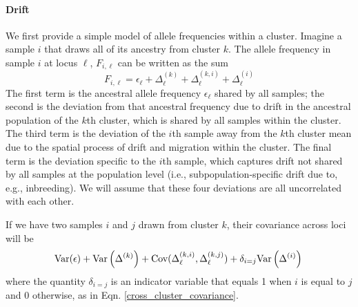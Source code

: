 \documentclass[12pt]{article}
\begin{document}
\paragraph{Drift} 
We first provide a simple model of allele frequencies within a cluster. 
Imagine a sample $i$ that draws all of its ancestry from cluster $k$.
The allele frequency in sample $i$ at locus $\ell$, $F_{i,\ell}$ can be
written as the sum
\begin{equation}
F_{i,\ell} = \epsilon_{\ell} + \Delta^{(k)}_{\ell} +
\Delta^{(k,i)}_{\ell} + \Delta^{(i)}_{\ell}
\label{drift_terms_no_admix}
\end{equation}
The first term is the ancestral allele frequency $\epsilon_\ell$ shared by all samples; 
the second is the deviation from that ancestral frequency 
due to drift in the ancestral population of the $k$th cluster,
which is shared by all samples within the cluster. 
The third term is the deviation of the $i$th sample away from the $k$th cluster mean 
due to the spatial process of drift and migration within the cluster.
The final term is the deviation specific to the $i$th sample,
which captures drift not shared by all samples at the population level
(i.e., subpopulation-specific drift due to, e.g., inbreeding). 
We will assume that these four deviations are all uncorrelated with each other.

If we have two samples $i$ and $j$ drawn from cluster $k$, 
their covariance across loci will be 
\begin{equation}
\text{Var}(\epsilon) +  \text{Var}\left( \Delta^{(k)} \right) +
\text{Cov}(\Delta^{(k,i)}_{\ell},\Delta^{(k,j)}_{\ell}) + \delta_{i=j} \text{Var}\left( \Delta^{(i)} \right)\ \\
\end{equation}
where the quantity $\delta_{i=j}$ is an indicator variable that equals 1 when $i$ is equal to $j$ and 0 otherwise, 
as in Eqn. \eqref{cross_cluster_covariance}.
\end{document}
